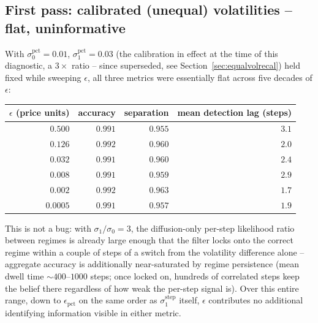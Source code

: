 \documentclass[11pt]{article}
\begin{document}
\subsection{First pass: calibrated (unequal) volatilities -- flat, uninformative}
\label{sec:epsilonsweep-unequal}
With $\sigma_0^{\text{pct}}=0.01$, $\sigma_1^{\text{pct}}=0.03$ (the calibration in effect at the time of this diagnostic, a $3\times$ ratio -- since superseded, see Section~\ref{sec:equalvolrecal}) held fixed while sweeping $\epsilon$, all three metrics were essentially flat across five decades of $\epsilon$:
\begin{center}
\begin{tabular}{@{}rrrr@{}}
\toprule
$\epsilon$ (price units) & accuracy & separation & mean detection lag (steps) \\
\midrule
$0.500$ & $0.991$ & $0.955$ & $3.1$ \\
$0.126$ & $0.992$ & $0.960$ & $2.0$ \\
$0.032$ & $0.991$ & $0.960$ & $2.4$ \\
$0.008$ & $0.991$ & $0.959$ & $2.9$ \\
$0.002$ & $0.992$ & $0.963$ & $1.7$ \\
$0.0005$ & $0.991$ & $0.957$ & $1.9$ \\
\bottomrule
\end{tabular}
\end{center}
This is not a bug: with $\sigma_1/\sigma_0=3$, the diffusion-only per-step likelihood ratio between regimes is already large enough that the filter locks onto the correct regime within a couple of steps of a switch from the volatility difference alone -- aggregate accuracy is additionally near-saturated by regime persistence (mean dwell time $\sim400$--$1000$ steps; once locked on, hundreds of correlated steps keep the belief there regardless of how weak the per-step signal is). Over this entire range, down to $\epsilon_{\text{pct}}$ on the same order as $\sigma_1^{\text{step}}$ itself, $\epsilon$ contributes no additional identifying information visible in either metric.
\end{document}
